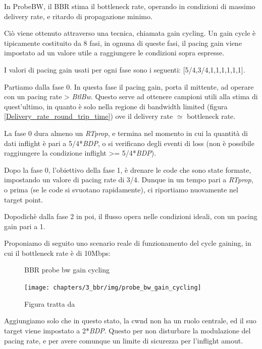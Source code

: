 In ProbeBW, il BBR stima il bottleneck rate, operando in condizioni di massimo delivery rate, e ritardo di propagazione minimo. \bigskip

Ciò viene ottenuto attraverso una tecnica, chiamata gain cycling. Un gain cycle è tipicamente costituito da 8 fasi, in ognuna di queste fasi, il pacing gain viene impostato ad un valore utile a raggiungere le condizioni sopra espresse. \bigskip

I valori di pacing gain usati per ogni fase sono i seguenti: [5/4,3/4,1,1,1,1,1,1]. \bigskip

Partiamo dalla fase 0. In questa fase il pacing gain, porta il mittente, ad operare con un pacing rate > \textit{BtlBw}. Questo serve ad ottenere campioni utili alla stima di quest'ultimo, in quanto è solo nella regione di bandwidth limited (figura \ref{Delivery_rate_round_trip_time}) ove il delivery rate $ \simeq $ bottleneck rate. \bigskip

La fase 0 dura almeno un \textit{RTprop}, e termina nel momento in cui la quantità di dati inflight è pari a 5/4*\textit{BDP}, o si verificano degli eventi di loss (non è possibile raggiungere la condizione inflight >= 5/4*\textit{BDP}). \bigskip

Dopo la fase 0, l'obiettivo della fase 1, è drenare le code che sono state formate, impostando un valore di pacing rate di 3/4. Dunque in un tempo pari a \textit{RTprop}, o prima (se le code si svuotano rapidamente), ci riportiamo nuovamente nel target point. \bigskip

Dopodichè dalla fase 2 in poi, il flusso opera nelle condizioni ideali, con un pacing gain pari a 1. \bigskip 

Proponiamo di seguito uno scenario reale di funzionamento del cycle gaining, in cui il bottleneck rate è di 10Mbps:

\begin{figure}[H]

\center
\caption{BBR probe bw gain cycling}
\texttt{[image: chapters/3\_bbr/img/probe\_bw\_gain\_cycling]}
\caption*{Figura tratta da \cite[p.~62]{Cardwell:2017:BCC:3042068.3009824}}

\end{figure}   
   
Aggiungiamo solo che in questo stato, la cwnd non ha un ruolo centrale, ed il suo target viene impostato a 2*\textit{BDP}. Questo per non disturbare la modulazione del pacing rate, e per avere comunque un limite di sicurezza per l'inflight amout.

